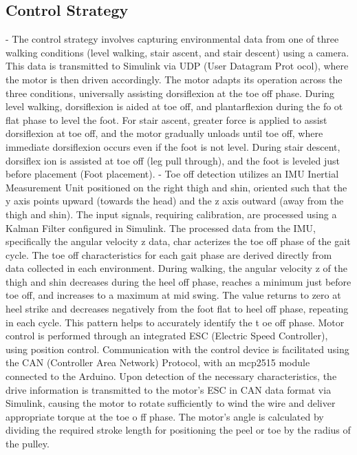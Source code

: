 \documentclass[journal,article,submit,pdftex,moreauthors]{Definitions/mdpi}
\begin{document}
\subsection{Control Strategy}
- The control strategy involves capturing environmental data from one of three walking
conditions (level walking, stair ascent, and stair descent) using a camera. This data is
transmitted to Simulink via UDP (User Datagram Prot ocol), where the motor is then driven
accordingly. The motor adapts its operation across the three conditions, universally assisting
dorsiflexion at the toe off phase. During level walking, dorsiflexion is aided at toe off, and
plantarflexion during the fo ot flat phase to level the foot. For stair ascent, greater force is
applied to assist dorsiflexion at toe off, and the motor gradually unloads until toe off, where
immediate dorsiflexion occurs even if the foot is not level. During stair descent, dorsiflex ion is
assisted at toe off (leg pull through), and the foot is leveled just before placement (Foot
placement).
- Toe off detection utilizes an IMU Inertial Measurement Unit positioned on the right thigh and
shin, oriented such that the y axis points upward (towards the head) and the z axis outward
(away from the thigh and shin). The input signals, requiring calibration, are processed using a
Kalman Filter configured in Simulink. The processed data from the IMU, specifically the angular
velocity z data, char acterizes the toe off phase of the gait cycle.
The toe off characteristics for each gait phase are derived directly from data collected in each
environment. During walking, the angular velocity z of the thigh and shin decreases during the
heel off phase, reaches a minimum just before toe off, and increases to a maximum at mid
swing. The value returns to zero at heel strike and decreases negatively from the foot flat to
heel off phase, repeating in each cycle. This pattern helps to accurately identify the t oe off
phase.
Motor control is performed through an integrated ESC (Electric Speed Controller), using
position control. Communication with the control device is facilitated using the CAN
(Controller Area Network) Protocol, with an mcp2515 module connected to the Arduino. Upon
detection of the necessary characteristics, the drive information is transmitted to the motor's
ESC in CAN data format via Simulink, causing the motor to rotate sufficiently to wind the wire
and deliver appropriate torque at the toe o ff phase. The motor's angle is calculated by dividing
the required stroke length for positioning the peel or toe by the radius of the pulley.
\end{document}
